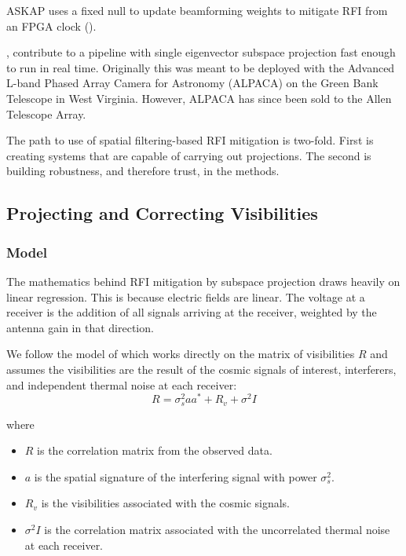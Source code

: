 \documentclass{pas}
\begin{document}
ASKAP uses a fixed null to update beamforming weights to mitigate RFI from
an FPGA clock (\cite{lourenco_mitigation_2024}).

\cite{ruzindana_real-time_2021}, \cite{whipple_wideband_2023} contribute to
a pipeline with single eigenvector subspace projection fast enough to run in
real time. Originally this was meant to be deployed with the Advanced L-band
Phased Array Camera for Astronomy (ALPACA) on the Green Bank Telescope in
West Virginia. However, ALPACA has since been sold to the Allen Telescope
Array.

The path to use of spatial filtering-based RFI mitigation is two-fold. First
is creating systems that are capable of carrying out projections. The second
is building robustness, and therefore trust, in the methods.



\subsection{Projecting and Correcting Visibilities}

\subsubsection{Model}

The mathematics behind RFI mitigation by subspace projection draws heavily on 
linear regression. This is because electric fields are linear. The voltage at
a receiver is the addition of all signals arriving at the receiver, weighted by
the antenna gain in that direction.

We follow the model of \cite{leshem_multichannel_2000} which works directly on the 
matrix of visibilities $R$ and assumes the visibilities are the result of 
the cosmic signals of interest, interferers, and independent thermal noise at 
each receiver:
\begin{equation}
  R = \sigma^{2}_{s} a a^{*} + R_{v} + \sigma^{2}I
\end{equation}

where
\begin{itemize}
    \item $R$ is the correlation matrix from the observed data.
    \item $a$ is the spatial signature of the interfering signal with power $\sigma^{2}_{s}$.
    \item $R_{v}$ is the visibilities associated with the cosmic signals.
    \item $\sigma^{2} I$ is the correlation matrix associated with the uncorrelated thermal noise at each receiver.
  \end{itemize}
\end{document}
